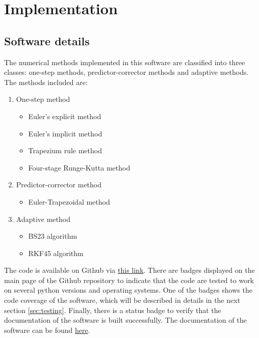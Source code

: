 \chapter{Implementation}
\label{chap:code-implementation}
\section{Software details}
The numerical methods implemented in this software are classified into three classes: one-step methods, predictor-corrector methods and adaptive methods. The methods included are:
\begin{enumerate}
    \item One-step method
    \begin{itemize}
        \item Euler's explicit method
        \item Euler's implicit method
        \item Trapezium rule method
        \item Four-stage Runge-Kutta method
    \end{itemize}
    \item Predictor-corrector method
    \begin{itemize}
        \item Euler-Trapezoidal method
    \end{itemize}
    \item Adaptive method
    \begin{itemize}
        \item BS23 algorithm
        \item RKF45 algorithm
    \end{itemize}
\end{enumerate}
The code is available on Github via \href{https://github.com/FarmHJ/numerical-solver}{this link}. There are badges displayed on the main page of the Github repository to indicate that the code are tested to work on several python versions and operating systems. One of the badges shows the code coverage of the software, which will be described in details in the next section \ref{sec:testing}. Finally, there is a status badge to verify that the documentation of the software is built successfully. The documentation of the software can be found \href{https://numerical-solver.readthedocs.io/en/latest/index.html}{here}.

